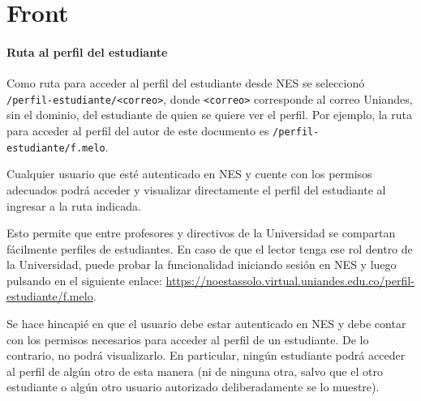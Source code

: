 \chapter{Front}

\subsubsection{Ruta al perfil del estudiante}

Como ruta para acceder al perfil del estudiante desde \gls{NES} se seleccionó \\\texttt{/perfil-estudiante/<correo>}, donde \texttt{<correo>} corresponde al correo Uniandes, sin el dominio, del estudiante de quien se quiere ver el perfil. Por ejemplo, la ruta para acceder al perfil del autor de este documento es \texttt{/perfil-estudiante/f.melo}.

Cualquier usuario que esté autenticado en \gls{NES} y cuente con los permisos adecuados podrá acceder y visualizar directamente el perfil del estudiante al ingresar a la ruta indicada.

Esto permite que entre profesores y directivos de la Universidad se compartan fácilmente perfiles de estudiantes. En caso de que el lector tenga ese rol dentro de la Universidad, puede probar la funcionalidad iniciando sesión en \gls{NES} y luego pulsando en el siguiente enlace: \url{https://noestassolo.virtual.uniandes.edu.co/perfil-estudiante/f.melo}.

Se hace hincapié en que el usuario debe estar autenticado en \gls{NES} y debe contar con los permisos necesarios para acceder al perfil de un estudiante. De lo contrario, no podrá visualizarlo. En particular, ningún estudiante podrá acceder al perfil de algún otro de esta manera (ni de ninguna otra, salvo que el otro estudiante o algún otro usuario autorizado deliberadamente se lo muestre).